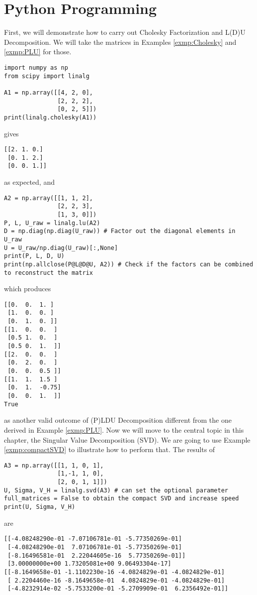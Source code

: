 \section{Python Programming}
First, we will demonstrate how to carry out Cholesky Factorization and L(D)U Decomposition. We will take the matrices in Examples \ref{exmp:Cholesky} and \ref{exmp:PLU} for those.
\begin{lstlisting}
import numpy as np
from scipy import linalg

A1 = np.array([[4, 2, 0],
               [2, 2, 2],
               [0, 2, 5]])
print(linalg.cholesky(A1))
\end{lstlisting}
gives
\begin{lstlisting}
[[2. 1. 0.]
 [0. 1. 2.]
 [0. 0. 1.]]    
\end{lstlisting}
as expected, and
\begin{lstlisting}
A2 = np.array([[1, 1, 2],
               [2, 2, 3],
               [1, 3, 0]])
P, L, U_raw = linalg.lu(A2)
D = np.diag(np.diag(U_raw)) # Factor out the diagonal elements in U_raw
U = U_raw/np.diag(U_raw)[:,None]
print(P, L, D, U)
print(np.allclose(P@L@D@U, A2)) # Check if the factors can be combined to reconstruct the matrix
\end{lstlisting}
which produces
\begin{lstlisting}
[[0.  0.  1. ]
 [1.  0.  0. ]
 [0.  1.  0. ]] 
[[1.  0.  0.  ]
 [0.5 1.  0.  ]
 [0.5 0.  1.  ]] 
[[2.  0.  0.  ]
 [0.  2.  0.  ]
 [0.  0.  0.5 ]] 
[[1.  1.  1.5 ]
 [0.  1.  -0.75]
 [0.  0.  1.  ]]
True
\end{lstlisting}
as another valid outcome of (P)LDU Decomposition different from the one derived in Example \ref{exmp:PLU}. Now we will move to the central topic in this chapter, the Singular Value Decomposition (SVD). We are going to use Example \ref{exmp:compactSVD} to illustrate how to perform that. The results of
\begin{lstlisting}
A3 = np.array([[1, 1, 0, 1],
               [1,-1, 1, 0],
               [2, 0, 1, 1]])
U, Sigma, V_H = linalg.svd(A3) # can set the optional parameter full_matrices = False to obtain the compact SVD and increase speed
print(U, Sigma, V_H)
\end{lstlisting}
are
\begin{lstlisting}
[[-4.08248290e-01 -7.07106781e-01 -5.77350269e-01]
 [-4.08248290e-01  7.07106781e-01 -5.77350269e-01]
 [-8.16496581e-01  2.22044605e-16  5.77350269e-01]] 
 [3.00000000e+00 1.73205081e+00 9.06493304e-17] 
[[-8.1649658e-01 -1.1102230e-16 -4.0824829e-01 -4.0824829e-01]
 [ 2.2204460e-16 -8.1649658e-01  4.0824829e-01 -4.0824829e-01]
 [-4.8232914e-02 -5.7533200e-01 -5.2709909e-01  6.2356492e-01]]    
\end{lstlisting}
